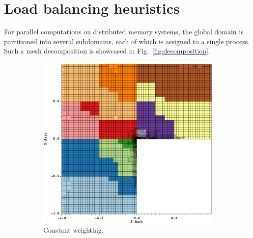 \section{Load balancing heuristics}
\label{sec:heuristics}


For parallel computations on distributed memory systems, the global domain is partitioned into several subdomains, each of which is assigned to a single process. Such a mesh decomposition is showcased in Fig.~\ref{fig:decomposition}.

\begin{figure}
\centering
\begin{subfigure}[t]{.49\textwidth}
  \centering
  \includegraphics[width=\textwidth]{figures/results/corner-2d-error-hp-legendre-05_subdomain12.png}
  \caption{Constant weighting.}
\end{subfigure}
\begin{subfigure}[t]{.49\textwidth}
  \centering

\end{subfigure}
\end{figure}
